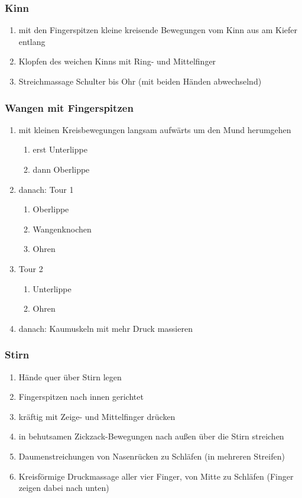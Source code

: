\subsubsection{Kinn}
\begin{enumerate}
\item mit den Fingerspitzen kleine kreisende Bewegungen vom Kinn aus am Kiefer entlang
\item Klopfen des weichen Kinns mit Ring- und Mittelfinger
\item Streichmassage Schulter bis Ohr (mit beiden Händen abwechselnd)
\end{enumerate}

\subsubsection{Wangen mit Fingerspitzen}
\begin{enumerate}
\item mit kleinen Kreisbewegungen langsam aufwärts um den Mund herumgehen
	\begin{enumerate}
	\item erst Unterlippe
	\item dann Oberlippe
	\end{enumerate}
\item danach: Tour 1
	\begin{enumerate}
	\item Oberlippe
	\item Wangenknochen
	\item Ohren
	\end{enumerate}
\item Tour 2
	\begin{enumerate}
	\item Unterlippe
	\item Ohren
	\end{enumerate}
\item danach: Kaumuskeln mit mehr Druck massieren
\end{enumerate}

\subsubsection{Stirn}
\begin{enumerate}
\item Hände quer über Stirn legen
\item Fingerspitzen nach innen gerichtet
\item kräftig mit Zeige- und Mittelfinger drücken
\item in behutsamen Zickzack-Bewegungen nach außen über die Stirn streichen
\item Daumenstreichungen von Nasenrücken zu Schläfen (in mehreren Streifen)
\item Kreisförmige Druckmassage aller vier Finger, von Mitte zu Schläfen (Finger zeigen dabei nach unten)
\end{enumerate}

